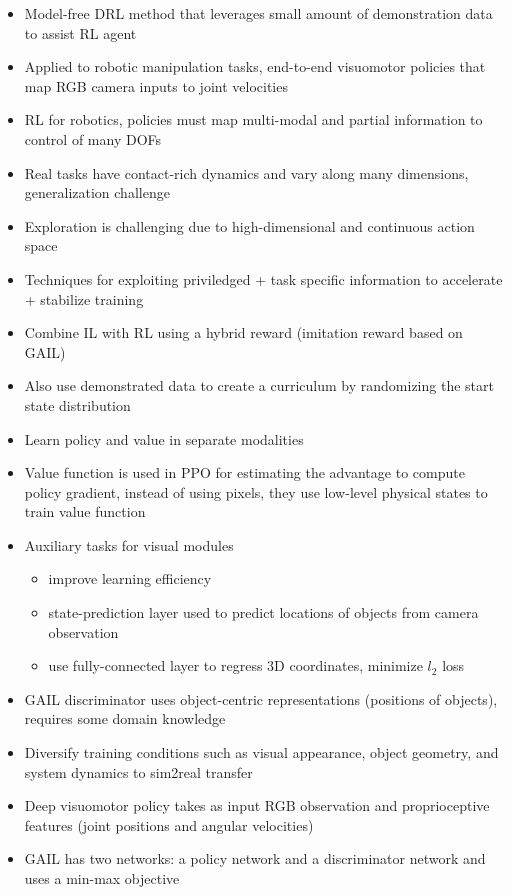 \begin{itemize}
  \item Model-free DRL method that leverages small amount of demonstration data to assist RL agent
  \item Applied to robotic manipulation tasks, end-to-end visuomotor policies that map RGB camera inputs to joint velocities
  \item RL for robotics, policies must map multi-modal and partial information to control of many DOFs
  \item Real tasks have contact-rich dynamics and vary along many dimensions, generalization challenge
  \item Exploration is challenging due to high-dimensional and continuous action space
  \item Techniques for exploiting priviledged + task specific information to accelerate + stabilize training
  \item Combine IL with RL using a hybrid reward (imitation reward based on GAIL)
  \item Also use demonstrated data to create a curriculum by randomizing the start state distribution
  \item Learn policy and value in separate modalities
  \item Value function is used in PPO for estimating the advantage to compute policy gradient, instead of using pixels, they use low-level physical states to train value function
  \item Auxiliary tasks for visual modules
  \begin{itemize}
    \item improve learning efficiency
    \item state-prediction layer used to predict locations of objects from camera observation
    \item use fully-connected layer to regress 3D coordinates, minimize $l_{2}$ loss
  \end{itemize}
  \item GAIL discriminator uses object-centric representations (positions of objects), requires some domain knowledge
  \item Diversify training conditions such as visual appearance, object geometry, and system dynamics to sim2real transfer
  \item Deep visuomotor policy takes as input RGB observation and proprioceptive features (joint positions and angular velocities)
  \item GAIL has two networks: a policy network and a discriminator network and uses a min-max objective

\end{itemize}
